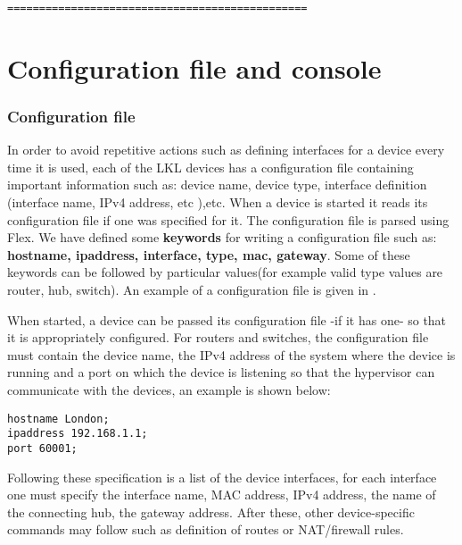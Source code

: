 {{\begin{lstlisting}
===============================================
\end{lstlisting}
 

\section{Configuration file and console}
\label{sec:config}

\subsubsection{Configuration file}
\label{subsec:config-file}
In order to avoid repetitive actions such as defining interfaces for a device every time it is used, each of the LKL devices has a configuration file containing important information such as: device name, device type, interface definition (interface name, IPv4 address, etc ),etc. When a device is started it reads its configuration file if one was specified for it. The configuration file is parsed using Flex. We have defined some \textbf{keywords} for writing a configuration file such as: \textbf{hostname, ipaddress, interface, type, mac, gateway}. Some of these keywords can be followed by particular values(for example valid type values are router, hub, switch). An example of a configuration file is given in .

When started, a device can be passed its configuration file -if it has one- so that it is appropriately configured.
For routers and switches, the configuration file must contain the device name, the IPv4 address of the system where the device is running and a port on which the device is listening so that the hypervisor can communicate with the devices, an example is shown below:
\lstset{language=TeX,caption=Fields of Configuration File,label=lst:config-file}
\begin{lstlisting}
hostname London;
ipaddress 192.168.1.1;
port 60001;
\end{lstlisting}
Following these specification is a list of the device interfaces, for each interface one must specify the interface name, MAC address, IPv4 address, the name of the connecting hub, the gateway address. After these, other device-specific commands may follow such as definition of routes or NAT/firewall rules.

}}
